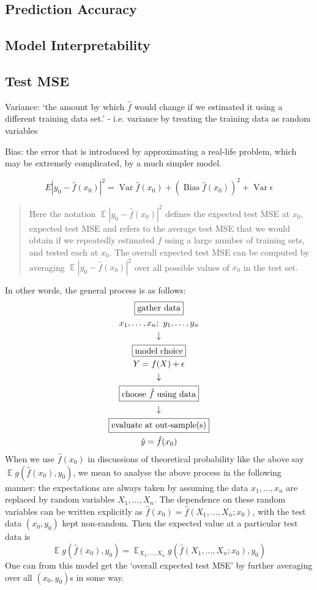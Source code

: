 \documentclass[11pt]{article}
\theoremstyle{definition}
\newcommand{\Var}{\operatorname{Var}}
\newcommand{\E}{\operatorname{\mathbb E}}
\newcommand{\Bias}{\operatorname{Bias}}
\begin{document}
\subsection{Prediction Accuracy}

\subsection{Model Interpretability}

\subsection{Test MSE}

Variance: `the amount by which $\hat f$ would change if we estimated it using a different training data set.' - i.e. variance by treating the training data as random variables

Bias: the error that is introduced by approximating a real-life problem, which may be extremely complicated, by a much simpler model. 

\[ E|y_0 - \hat f(x_0)|^2 = \Var\hat f(x_0) + (\Bias \hat f(x_0))^2 + \Var\epsilon \tag{2.7} \]
{\color{red}}
\begin{quote} Here the notation $\E|y_0 - \hat f(x_0)|^2$ defines the expected test MSE at $x_0$, expected test MSE and refers to the average test MSE that we would obtain if we repeatedly estimated $f$ using a large number of training sets, and tested each at $x_0$. The overall expected test MSE can be computed by averaging $\E|y_0 - \hat f(x_0)|^2$ over all possible values of $x_0$ in the test set. 	
\end{quote}
In other words, the general process is as follows:
\begin{gather*}
\fbox{gather data} \\ x_1,\dots,x_n;\ y_1,\dots,y_n\\ \downarrow \\
\fbox{model choice} \\ Y = f(X) + \epsilon\\ \downarrow \\
\fbox{choose $\hat f$ using data}
\\ \downarrow \\
\fbox{evaluate at out-sample(s)}
\\
\hat y = \hat f(x_0)
\end{gather*}
When we use $\hat f(x_0)$ in discussions of theoretical probability like the above say $\E g(\hat f(x_0), y_0)$, we mean to analyse the above process in the following manner: the expectations are always taken by assuming the data $x_1,\dots,x_n$ are replaced by random variables $X_1,\dots,X_n$. The dependence on these random variables can be written explicitly as $\hat f(x_0) = \hat f(X_1,\dots, X_n; x_0)$, with the test data $(x_0,y_0)$ kept non-random. Then the expected value at a particular test data is
\[ \E g(\hat f(x_0), y_0) = \E_{X_1,\dots,X_n} g(\hat f(X_1,\dots, X_n; x_0), y_0)\]
One can from this model get the `overall expected test MSE' by further averaging over all $(x_0, y_0)$s in some way.
\end{document}
